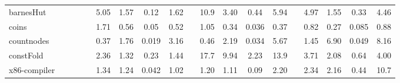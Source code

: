 \begin{tabular}{@{}l rrrr cccc r cccc r cccc@{}}
    barnesHut &&&&& 5.05  & 1.57 & 0.12 & 1.62 && 10.9 & 3.40 & 0.44 & 5.94 && 4.97 & 1.55 & 0.33 & 4.46 \\


    coins &&&&& 1.71 & 0.56 & 0.05 & 0.52 && 1.05 & 0.34 & 0.036 & 0.37 && 0.82  & 0.27 & 0.085  & 0.88 \\

    countnodes &&&&& 0.37  & 1.76 & 0.019 & 3.16 && 0.46  & 2.19 & 0.034 & 5.67  && 1.45  & 6.90  & 0.049 & 8.16 \\

    constFold &&&&& 2.36 & 1.32 & 0.23 & 1.44 && 17.7 & 9.94 & 2.23 & 13.9 && 3.71 & 2.08 & 0.64 & 4.00 \\



    x86-compiler &&&&& 1.34 & 1.24 & 0.042  & 1.02 && 1.20 & 1.11 & 0.09 & 2.20 && 2.34 & 2.16 & 0.44 & 10.7 \\



\end{tabular}
